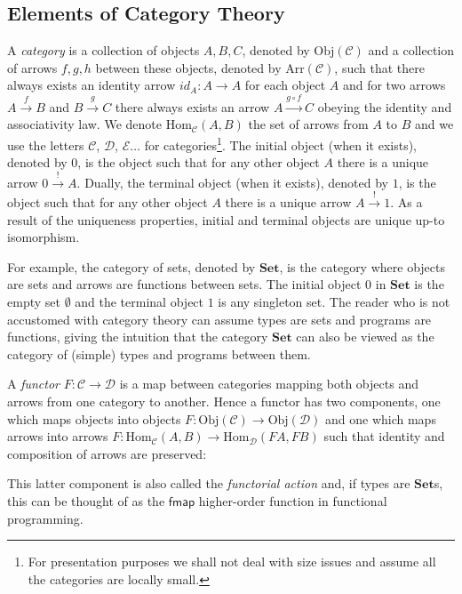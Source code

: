 \documentclass[a4paper,UKenglish,cleveref, autoref, thm-restate]{lipics-v2021}
\newcommand{\operator}[1]{\textsf{#1}}
\newcommand{\CatC}{\mathcal{C}}
\newcommand{\CatD}{\mathcal{D}}
\newcommand{\CatE}{\mathcal{E}}
\newcommand{\Set}{\mathbf{Set}}
\newcommand{\Hom}{\text{Hom}}
\newcommand{\Obj}{\text{Obj}}
\newcommand{\Arr}{\text{Arr}}
\begin{document}
\subsection{Elements of Category Theory}
A \emph{category} is a collection of objects $A, B, C$, denoted by $\Obj(\CatC)$
and a collection of arrows $f, g, h$ between these objects, denoted by $\Arr
(\CatC)$, such that there always exists an identity arrow $id_{A} : A \to A$ for
each object $A$ and for two arrows $A \xrightarrow{f} B$ and $B \xrightarrow{g}
C$ there always exists an arrow $A \xrightarrow{g\circ f} C$ obeying the identity and
associativity law. We denote $\Hom_{\CatC} (A, B)$ the set of arrows from $A$ to
$B$ and we use the letters $\CatC$, $\CatD$, $\CatE\dots$ for
categories\footnote[1]{For presentation purposes we shall not deal with size
  issues and assume all the categories are locally small.}. The initial object (when it exists), denoted by $0$,
is the object such that for any other object $A$
there is a unique arrow $0 \xrightarrow{!} A$.  Dually, the terminal object (when it exists),
denoted by $1$, is the object such that for any other object $A$ there is a
unique arrow $A \xrightarrow{!} 1$. As a result of the uniqueness properties, initial and terminal objects are unique up-to
isomorphism.

For example, the category of sets, denoted by $\Set$, is the category where
objects are sets and arrows are functions between sets. The initial object $0$
in $\Set$ is the empty set $\emptyset$ and the terminal object $1$ is any
singleton set. The reader who is not accustomed with category theory can assume
types are sets and programs are functions, giving the intuition that the category $\Set$ can also be viewed as the category of (simple) types and programs between them.

A \emph{functor} $F : \CatC \to \CatD$ is a map between categories mapping both
objects and arrows from one category to another. Hence a functor has two
components, one which maps objects into objects
$F : \Obj(\CatC) \to \Obj(\CatD)$ and one which maps arrows into arrows
$F : \Hom_{\CatC}(A, B) \to \Hom_{\CatD} (FA,FB)$ such that identity and
composition of arrows are preserved:
This latter component is also called the \emph{functorial action} and, if types
are $\Set$s, this can be thought of as the $\operator{fmap}$ higher-order
function in functional programming.
\end{document}
